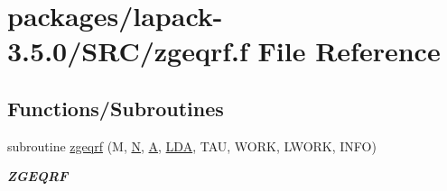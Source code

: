 \hypertarget{zgeqrf_8f}{}\section{packages/lapack-\/3.5.0/\+S\+R\+C/zgeqrf.f File Reference}
\label{zgeqrf_8f}
\subsection*{Functions/\+Subroutines}
\begin{DoxyCompactItemize}
\item 
subroutine \hyperlink{group__complex16GEcomputational_ga91323e2e5f9678324dde6fd72f1e6bd1}{zgeqrf} (M, \hyperlink{polmisc_8c_a0240ac851181b84ac374872dc5434ee4}{N}, \hyperlink{classA}{A}, \hyperlink{example__user_8c_ae946da542ce0db94dced19b2ecefd1aa}{L\+D\+A}, T\+A\+U, W\+O\+R\+K, L\+W\+O\+R\+K, I\+N\+F\+O)
\begin{DoxyCompactList}\small\item\em {\bfseries Z\+G\+E\+Q\+R\+F} \end{DoxyCompactList}\end{DoxyCompactItemize}
